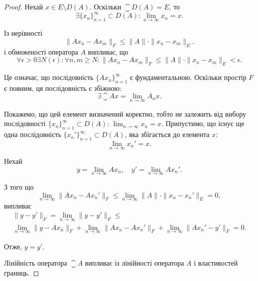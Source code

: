 \begin{proof}
Нехай $x \in E \setminus D(A)$. Оскільки $\closure D(A) = E$, то
\begin{equation*}
    \exists \{x_n\}_{n = 1}^\infty \subset D(A):
    \lim_{n \to \infty} x_n = x.
\end{equation*}

Із нерівності
\begin{equation*}
    \|Ax_n - Ax_m\|_F \le \|A\| \cdot \|x_n - x_m\|_E.
\end{equation*}
і обмеженості оператора $A$ випливає, що
\begin{equation*}
    \forall \epsilon > 0 \exists N(\epsilon):
    \forall n, m \ge N:
    \|A x_n - A x_m\|_F \le \|A\| \cdot \|x_n - x_m\|_E < \epsilon.
\end{equation*}

Це означає, що послідовність $\{Ax_n\}_{n = 1}^\infty$ є фундаментальною.
Оскільки простір $F$ є повним, ця послідовність є збіжною:
\begin{equation*}
    \exists \closure A x = \lim_{n \to \infty} A_n x.
\end{equation*}

Покажемо, що цей елемент визначений коректно, тобто не
залежить від вибору послідовності $\{x_n\}_{n = 1}^\infty \subset D(A)$:
$\lim_{n \to \infty} x_n = x$.
Припустимо, що існує ще одна послідовність $\{x_n'\}_{n = 1}^\infty \subset D(A)$,
яка збігається до елемента $x$:
\begin{equation*}
    \lim_{n \to \infty} x_n' = x.
\end{equation*}

Нехай
\begin{equation*}
    y = \lim_{n \to \infty} A x_n, \quad y' = \lim_{n \to \infty} A x_n'.
\end{equation*}

З того що
\begin{equation*}
    \lim_{n \to \infty} \|Ax_n - Ax_n'\|_F \le
    \lim_{n \to \infty} \|A\| \cdot \|x_n - x_n'\|_E = 0,
\end{equation*}
випливає
\begin{multline*}
    \|y - y'\|_F = \lim_{n \to \infty} \|y - y'\|_F \le \\
    \lim_{n \to \infty} \|y - A x_n\|_F +
    \lim_{n \to \infty} \|A x_n - A x_n'\|_F +
    \lim_{n \to \infty} \|A x_n' - y'\|_F = 0.
\end{multline*}

Отже, $y = y'$.

Лінійність оператора $\closure A$ випливає із лінійності оператора
$A$ і властивостей границь.


\end{proof}
